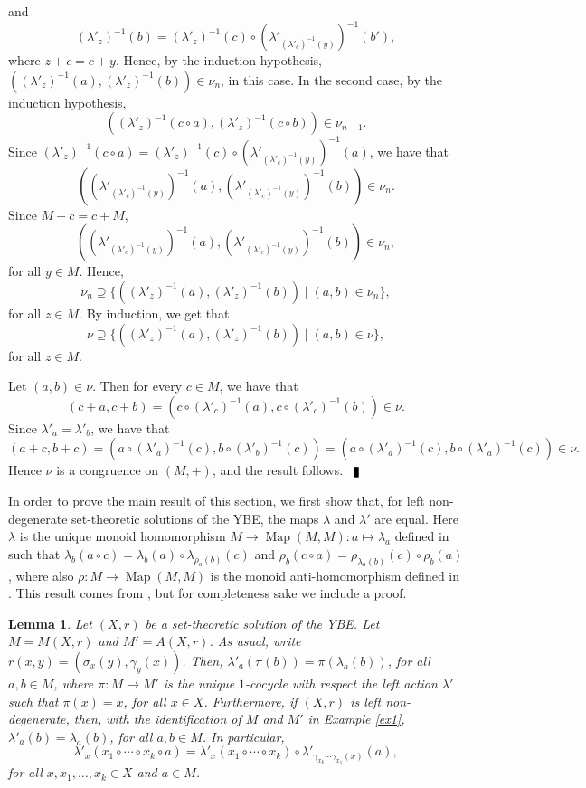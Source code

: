 \documentclass[10pt]{article}
\newtheorem{lemma}[theorem]{Lemma}
\newcommand{\Map}{\operatorname{Map}}
\newenvironment{proof}{\par\noindent{\bf Proof.}}{$\qed$\par\bigskip}
\newcommand{\qed}{\enspace\vrule  height6pt  width4pt  depth2pt}
\begin{document}
\begin{proof}
and
$$(\lambda'_z)^{-1}(b)=(\lambda'_z)^{-1}(c)\circ (\lambda'_{(\lambda'_c)^{-1}(y)})^{-1}(b'),$$
where $z+c=c+y$. Hence, by the induction hypothesis,  $( (\lambda'_z)^{-1}(a),(\lambda'_z)^{-1}(b))\in \nu_n$, in this case. In the second case, by the induction hypothesis,
$$( (\lambda'_z)^{-1}(c\circ a),(\lambda'_z)^{-1}(c\circ b))\in \nu_{n-1}.$$
Since $(\lambda'_z)^{-1}(c\circ a)=(\lambda'_z)^{-1}(c)\circ (\lambda'_{(\lambda'_c)^{-1}(y)})^{-1}(a)$, we have that
$$((\lambda'_{(\lambda'_c)^{-1}(y)})^{-1}(a),(\lambda'_{(\lambda'_c)^{-1}(y)})^{-1}(b))\in \nu_n.$$
Since $M+c=c+M$,
$$((\lambda'_{(\lambda'_c)^{-1}(y)})^{-1}(a),(\lambda'_{(\lambda'_c)^{-1}(y)})^{-1}(b))\in \nu_n,$$
for all $y\in M$. Hence,
$$\nu_{n}\supseteq \{ ( (\lambda'_z)^{-1}(a),(\lambda'_z)^{-1}(b))\mid (a,b)\in\nu_{n}\},$$
for	all $z\in M$. By induction, we get that
$$\nu\supseteq \{ ( (\lambda'_z)^{-1}(a),(\lambda'_z)^{-1}(b))\mid (a,b)\in\nu\},$$
for	all $z\in M$.

	Let $(a,b)\in \nu$. Then for every $c\in M$, we have that
	$$(c+a,c+b)=(c\circ (\lambda'_c)^{-1}(a),c\circ (\lambda'_c)^{-1}(b))\in \nu.$$
	Since $\lambda'_a=\lambda'_b$,  we have that
	$$(a+c,b+c)=(a\circ(\lambda'_a)^{-1}(c),b\circ(\lambda'_b)^{-1}(c))=(a\circ(\lambda'_a)^{-1}(c),b\circ(\lambda'_a)^{-1}(c))\in \nu.$$
	Hence $\nu$ is a congruence on $(M,+)$, and the result follows.
\end{proof}

 In order to prove the main result of this section, we first show that, for left non-degenerate set-theoretic solutions of the YBE, the maps $\lambda$ and $\lambda'$ are equal.
Here $\lambda$ is the unique monoid homomorphism  
$M\rightarrow \Map (M,M): a\mapsto \lambda_a$ defined 
in \cite[Theorem 2.1]{CJV} such that 
$\lambda_b (a\circ c) =\lambda_b(a) \circ \lambda_{\rho_a(b)}(c)$ 
and $\rho_{b}(c\circ a) = \rho_{\lambda_a(b)}(c) \circ \rho_b (a)$, 
where also $\rho : M \rightarrow \Map (M,M)$ is the monoid anti-homomorphism 
defined in \cite[Theorem 2.1]{CJV}.
This result comes from \cite{CJKVV}, but for completeness sake we include a proof.

\begin{lemma}\label{lemma2}
	Let $(X,r)$ be a set-theoretic solution of the YBE. Let $M=M(X,r)$ and $M'=A(X,r)$. As usual, write  $r(x,y)=(\sigma_x(y),\gamma_y(x))$. Then, $\lambda'_a(\pi(b))=\pi(\lambda_a(b))$, for all $a,b\in M$, where  $\pi\colon M\rightarrow M'$ is the unique $1$-cocycle with respect the left action $\lambda'$ such that $\pi(x)=x$, for all $x\in X$. Furthermore, if $(X,r)$ is left non-degenerate, then, with the identification of $M$ and $M'$ in Example \ref{ex1}, $\lambda'_a(b)=\lambda_a(b)$, for all $a,b\in M$. In particular,
	\begin{equation}\label{gamma}\lambda'_x(x_1\circ\cdots\circ x_k\circ a)=\lambda'_x(x_1\circ\cdots\circ x_k)\circ\lambda'_{\gamma_{x_k}\cdots\gamma_{x_1}(x)}(a),
	\end{equation}
	for all $x,x_1,\dots, x_k\in X$ and $a\in M$.
\end{lemma}
\end{document}
